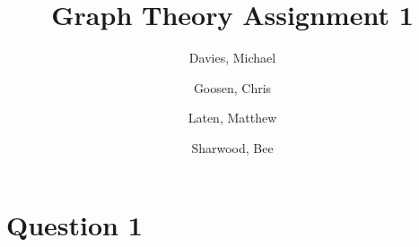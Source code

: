 \documentclass[a4paper]{article}
\begin{document}
\title{Graph Theory Assignment 1}
\author {
    Davies, Michael\\
    \and
    Goosen, Chris\\
    \and
    Laten, Matthew\\
    \and
    Sharwood, Bee\\
    \and
}
\maketitle

\section{Question 1}
\end{document}
